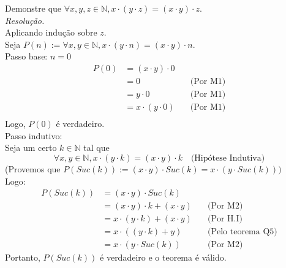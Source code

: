 Demonstre que $\forall x, y, z \in \mathbb{N}, x \cdot (y \cdot z) = (x \cdot y) \cdot z$. \\
\emph{Resolução.} \\
Aplicando indução sobre $z$. \\
Seja $P(n) := \forall x, y \in \mathbb{N}, x \cdot (y \cdot n) = (x \cdot y) \cdot n$. \\
Passo base: $n = 0$
\begin{align*}
    P(0) & = (x \cdot y) \cdot 0                         \\
         & = 0                   & \quad \text{(Por M1)} \\
         & = y \cdot 0           & \quad \text{(Por M1)} \\
         & = x \cdot (y \cdot 0) & \quad \text{(Por M1)} \\
\end{align*}
Logo, $P(0)$ é verdadeiro. \\
Passo indutivo: \\
Seja um certo $k \in \mathbb{N}$ tal que
\begin{displaymath}
    \forall x, y \in \mathbb{N}, x \cdot (y \cdot k) = (x \cdot y) \cdot k \quad \text{(Hipótese Indutiva)}
\end{displaymath}
(Provemos que $P(Suc(k)) := (x \cdot y) \cdot Suc(k) = x \cdot (y \cdot Suc(k)))$ \\
Logo:
\begin{align*}
    P(Suc(k)) & = (x \cdot y) \cdot Suc(k)                                           \\
              & =(x \cdot y) \cdot k + (x \cdot y)  & \quad \text{(Por M2)}          \\
              & = x \cdot (y \cdot k) + (x \cdot y) & \quad \text{(Por H.I)}         \\
              & = x \cdot ((y \cdot k) + y)         & \quad \text{(Pelo teorema Q5)} \\
              & = x \cdot (y \cdot Suc(k))          & \quad \text{(Por M2)}
\end{align*}
Portanto, $P(Suc(k))$ é verdadeiro e o teorema é válido.
